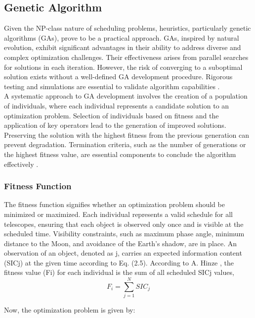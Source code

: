 \subsection{Genetic Algorithm}

Given the NP-class nature of scheduling problems, heuristics, particularly genetic algorithms (GAs), prove to be a practical approach. GAs, inspired by natural evolution, exhibit significant advantages in their ability to address diverse and complex optimization challenges. Their effectiveness arises from parallel searches for solutions in each iteration. However, the risk of converging to a suboptimal solution exists without a well-defined GA development procedure. Rigorous testing and simulations are essential to validate algorithm capabilities \cite{nsga,hinze1}.\\

A systematic approach to GA development involves the creation of a population of individuals, where each individual represents a candidate solution to an optimization problem. Selection of individuals based on fitness and the application of key operators lead to the generation of improved solutions. Preserving the solution with the highest fitness from the previous generation can prevent degradation. Termination criteria, such as the number of generations or the highest fitness value, are essential components to conclude the algorithm effectively \cite{hinze1}.\\

\subsubsection{Fitness Function} 

The fitness function signifies whether an optimization problem should be minimized or maximized. Each individual represents a valid schedule for all telescopes, ensuring that each object is observed only once and is visible at the scheduled time. Visibility constraints, such as maximum phase angle, minimum distance to the Moon, and avoidance of the Earth's shadow, are in place. An observation of an object, denoted as j, carries an expected information content (SICj) at the given time according to Eq. (2.5). According to A. Hinze \cite{hinze1}, the fitness value (Fi) for each individual is the sum of all scheduled SICj values,
\begin{equation}
	F_i=\sum_{j=1}^{N} SIC_j
\end{equation} 

Now, the optimization problem is given by:

